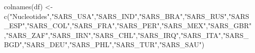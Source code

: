 \documentclass[
]{article}
\newenvironment{Shaded}{\begin{snugshade}}{\end{snugshade}}
\newcommand{\FunctionTok}[1]{\textcolor[rgb]{0.00,0.00,0.00}{#1}}
\newcommand{\NormalTok}[1]{#1}
\newcommand{\OtherTok}[1]{\textcolor[rgb]{0.56,0.35,0.01}{#1}}
\newcommand{\StringTok}[1]{\textcolor[rgb]{0.31,0.60,0.02}{#1}}
\begin{document}
\begin{Shaded}
\begin{Highlighting}[]
\FunctionTok{colnames}\NormalTok{(df) }\OtherTok{\textless{}{-}} \FunctionTok{c}\NormalTok{(}\StringTok{"Nucleotides"}\NormalTok{,}\StringTok{"SARS\_USA"}\NormalTok{,}\StringTok{"SARS\_IND"}\NormalTok{,}\StringTok{"SARS\_BRA"}\NormalTok{,}\StringTok{"SARS\_RUS"}\NormalTok{,}\StringTok{"SARS\_ESP"}\NormalTok{,}\StringTok{"SARS\_COL"}\NormalTok{,}\StringTok{"SARS\_FRA"}\NormalTok{,}\StringTok{"SARS\_PER"}\NormalTok{,}\StringTok{"SARS\_MEX"}\NormalTok{,}\StringTok{"SARS\_GBR"}\NormalTok{,}\StringTok{"SARS\_ZAF"}\NormalTok{,}\StringTok{"SARS\_IRN"}\NormalTok{,}\StringTok{"SARS\_CHL"}\NormalTok{,}\StringTok{"SARS\_IRQ"}\NormalTok{,}\StringTok{"SARS\_ITA"}\NormalTok{,}\StringTok{"SARS\_BGD"}\NormalTok{,}\StringTok{"SARS\_DEU"}\NormalTok{,}\StringTok{"SARS\_PHL"}\NormalTok{,}\StringTok{"SARS\_TUR"}\NormalTok{,}\StringTok{"SARS\_SAU"}\NormalTok{)}


\end{Highlighting}
\end{Shaded}
\end{document}
